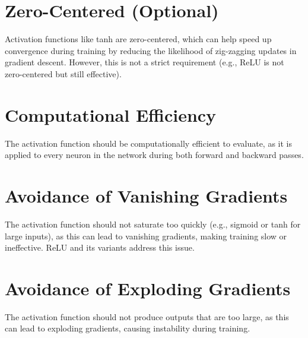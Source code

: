 \begin{notechapter}
\section{Zero-Centered (Optional)}
Activation functions like tanh are zero-centered, 
which can help speed up convergence during training 
by reducing the likelihood of zig-zagging updates in 
gradient descent. However, this is not a strict 
requirement (e.g., ReLU is not zero-centered but 
still effective).

\section{Computational Efficiency}
The activation function should be computationally 
efficient to evaluate, as it is applied to every 
neuron in the network during both forward and 
backward passes.

\section{Avoidance of Vanishing Gradients}
The activation function should not saturate too 
quickly (e.g., sigmoid or tanh for large inputs), 
as this can lead to vanishing gradients, making 
training slow or ineffective. ReLU and its variants 
address this issue.

\section{Avoidance of Exploding Gradients}
The activation function should not produce outputs 
that are too large, as this can lead to exploding 
gradients, causing instability during training.


\end{notechapter}
